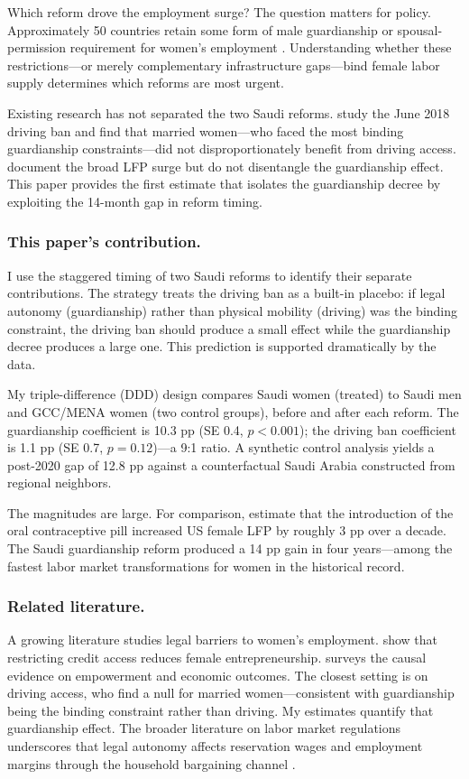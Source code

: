 \documentclass[12pt]{article}
\begin{document}
Which reform drove the employment surge? The question matters for policy. Approximately 50 countries retain some form of male guardianship or spousal-permission requirement for women's employment \citep{WorldBankWBL2024}. Understanding whether these restrictions---or merely complementary infrastructure gaps---bind female labor supply determines which reforms are most urgent.

Existing research has not separated the two Saudi reforms. \citet{BursztynGY2023} study the June 2018 driving ban and find that married women---who faced the most binding guardianship constraints---did not disproportionately benefit from driving access. \citet{CrandallR2024} document the broad LFP surge but do not disentangle the guardianship effect. This paper provides the first estimate that isolates the guardianship decree by exploiting the 14-month gap in reform timing.

\subsubsection*{This paper's contribution.} I use the staggered timing of two Saudi reforms to identify their separate contributions. The strategy treats the driving ban as a built-in placebo: if legal autonomy (guardianship) rather than physical mobility (driving) was the binding constraint, the driving ban should produce a small effect while the guardianship decree produces a large one. This prediction is supported dramatically by the data.

My triple-difference (DDD) design compares Saudi women (treated) to Saudi men and GCC/MENA women (two control groups), before and after each reform. The guardianship coefficient is 10.3 pp (SE 0.4, $p < 0.001$); the driving ban coefficient is 1.1 pp (SE 0.7, $p = 0.12$)---a 9:1 ratio. A synthetic control analysis yields a post-2020 gap of 12.8 pp against a counterfactual Saudi Arabia constructed from regional neighbors.

The magnitudes are large. For comparison, \citet{GoldinPolacheck1987} estimate that the introduction of the oral contraceptive pill increased US female LFP by roughly 3 pp over a decade. The Saudi guardianship reform produced a 14 pp gain in four years---among the fastest labor market transformations for women in the historical record.

\subsubsection*{Related literature.} A growing literature studies legal barriers to women's employment. \citet{MilliganStabile2007} show that restricting credit access reduces female entrepreneurship. \citet{Duflo2012} surveys the causal evidence on empowerment and economic outcomes. The closest setting is \citet{BursztynGY2023} on driving access, who find a null for married women---consistent with guardianship being the binding constraint rather than driving. My estimates quantify that guardianship effect. The broader literature on labor market regulations \citep{AngristEvans1998,GoldinKatz2002} underscores that legal autonomy affects reservation wages and employment margins through the household bargaining channel \citep{BursztynEtal2020}.
\end{document}
